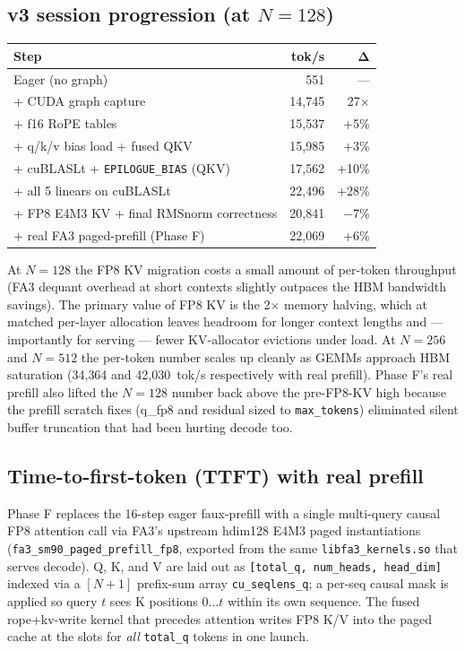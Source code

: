 \subsection{v3 session progression (at $N\!=\!128$)}

\begin{tabular}{lrr}
\toprule
\textbf{Step} & \textbf{tok/s} & $\boldsymbol\Delta$ \\
\midrule
Eager (no graph)                              & 551     & --- \\
+ CUDA graph capture                          & 14{,}745 & 27$\times$ \\
+ f16 RoPE tables                             & 15{,}537 & +5\% \\
+ q/k/v bias load + fused QKV                  & 15{,}985 & +3\% \\
+ cuBLASLt + \texttt{EPILOGUE\_BIAS} (QKV)    & 17{,}562 & +10\% \\
+ all 5 linears on cuBLASLt                   & 22{,}496 & +28\% \\
+ FP8 E4M3 KV + final RMSnorm correctness     & 20{,}841 & $-$7\% \\
+ real FA3 paged-prefill (Phase F)            & 22{,}069 & +6\% \\
\bottomrule
\end{tabular}

At $N\!=\!128$ the FP8 KV migration costs a small amount of per-token
throughput (FA3 dequant overhead at short contexts slightly outpaces
the HBM bandwidth savings). The primary value of FP8 KV is the
2$\times$ memory halving, which at matched per-layer allocation
leaves headroom for longer context lengths and --- importantly for
serving --- fewer KV-allocator evictions under load. At $N\!=\!256$
and $N\!=\!512$ the per-token number scales up cleanly as GEMMs
approach HBM saturation (34{,}364 and 42{,}030~tok/s respectively
with real prefill). Phase F's real prefill also lifted the $N\!=\!128$
number back above the pre-FP8-KV high because the prefill scratch
fixes (q\_fp8 and residual sized to \texttt{max\_tokens}) eliminated
silent buffer truncation that had been hurting decode too.

\subsection{Time-to-first-token (TTFT) with real prefill}
\label{sec:ttft}

Phase F replaces the 16-step eager faux-prefill with a single
multi-query causal FP8 attention call via FA3's upstream hdim128 E4M3
paged instantiations (\texttt{fa3\_sm90\_paged\_prefill\_fp8}, exported
from the same \texttt{libfa3\_kernels.so} that serves decode). Q, K,
and V are laid out as \texttt{[total\_q, num\_heads, head\_dim]} indexed
via a $[N{+}1]$ prefix-sum array \texttt{cu\_seqlens\_q}; a per-seq causal
mask is applied so query $t$ sees K positions $0\ldots t$ within its own
sequence. The fused rope+kv-write kernel that precedes attention writes
FP8 K/V into the paged cache at the slots for \emph{all}
\texttt{total\_q} tokens in one launch.

